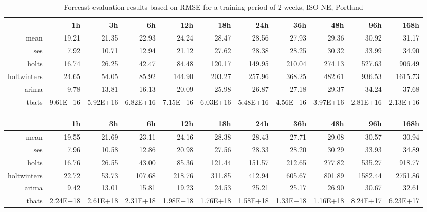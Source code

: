 \begin{landscape}
\begin{table}[ht]
\centering
\vspace*{-0.2in}
\begin{tabular}{rrrrrrrrrrr}
  \hline
 & 1h & 3h & 6h & 12h & 18h & 24h & 36h & 48h & 96h & 168h \\ 
  \hline
mean & 19.21 & 21.35 & 22.93 & 24.24 & 28.47 & 28.56 & 27.93 & 29.36 & 30.92 & 31.17 \\ 
  ses & 7.92 & 10.71 & 12.94 & 21.12 & 27.62 & 28.38 & 28.25 & 30.32 & 33.99 & 34.90 \\ 
  holts & 16.74 & 26.25 & 42.47 & 84.48 & 120.17 & 149.95 & 210.04 & 274.13 & 527.63 & 906.49 \\ 
  holtwinters & 24.65 & 54.05 & 85.92 & 144.90 & 203.27 & 257.96 & 368.25 & 482.61 & 936.53 & 1615.73 \\ 
  arima & 9.78 & 13.81 & 16.13 & 20.09 & 25.98 & 26.87 & 27.18 & 29.37 & 34.24 & 37.68 \\ 
  tbats & 9.61E+16 & 5.92E+16 & 6.82E+16 & 7.15E+16 & 6.03E+16 & 5.48E+16 & 4.56E+16 & 3.97E+16 & 2.81E+16 & 2.13E+16 \\ 
   \hline
\end{tabular}
\caption{Forecast evaluation results based on RMSE for a training period of 2 weeks, ISO NE, Portland}
\label{tab:app_results_portland_2weeks}
\end{table}
\begin{table}[ht]
\centering
\vspace*{-0.1in}
\begin{tabular}{rrrrrrrrrrr}
  \hline
 & 1h & 3h & 6h & 12h & 18h & 24h & 36h & 48h & 96h & 168h \\ 
  \hline
mean & 19.55 & 21.69 & 23.11 & 24.16 & 28.38 & 28.43 & 27.71 & 29.08 & 30.57 & 30.94 \\ 
  ses & 7.96 & 10.58 & 12.86 & 20.98 & 27.56 & 28.33 & 28.20 & 30.29 & 33.93 & 34.89 \\ 
  holts & 16.76 & 26.55 & 43.00 & 85.36 & 121.44 & 151.57 & 212.65 & 277.82 & 535.27 & 918.77 \\ 
  holtwinters & 22.72 & 53.73 & 107.68 & 218.76 & 311.85 & 412.94 & 605.67 & 801.89 & 1582.44 & 2751.86 \\ 
  arima & 9.42 & 13.01 & 15.81 & 19.23 & 24.53 & 25.21 & 25.17 & 26.90 & 30.67 & 32.61 \\ 
  tbats & 2.24E+18 & 2.61E+18 & 2.31E+18 & 1.98E+18 & 1.76E+18 & 1.58E+18 & 1.33E+18 & 1.16E+18 & 8.24E+17 & 6.23E+17 \\ 

\end{tabular}
\end{table}
\end{landscape}
